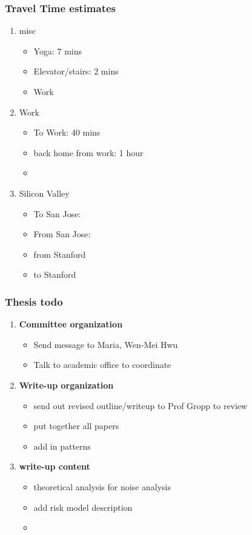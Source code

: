 \begin{frame}
\frametitle{Travel Time estimates}
\begin{enumerate}
\item \small misc
\begin{itemize}
\item \tiny Yoga:  7 mins
\item \tiny Elevator/stairs: 2 mins
\item \tiny Work
\end{itemize}
\item \small Work
\begin{itemize}
\item \tiny To Work: 40 mins
\item \tiny back home from work: 1 hour
\item \tiny
\end{itemize}
\item \small Silicon Valley
\begin{itemize}
\item \tiny To San Jose:
\item \tiny From San Jose:
\item \tiny from Stanford
\item \tiny to Stanford
\end{itemize}
\end{enumerate}
\end{frame}


\begin{frame}
\frametitle{Thesis todo}
\begin{enumerate}
\item \small \textbf{Committee organization}
\begin{itemize}
\item \tiny Send message to Maria, Wen-Mei Hwu
\item \tiny Talk to academic office to coordinate
\end{itemize}
\item \small \textbf{Write-up organization}
\begin{itemize}
\item \tiny send out revised outline/writeup to Prof Gropp to review
\item \tiny put together all papers
\item \tiny add in patterns
\end{itemize}
\item \small \textbf{write-up content}
\begin{itemize}
\item \tiny theoretical analysis for noise analysis
\item \tiny add risk model description
\item \tiny
\end{itemize}
\end{enumerate}
\end{frame}

